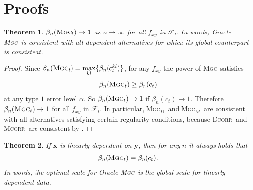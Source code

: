 \documentclass[11pt]{article}
\newcommand{\note}[2][]{\added[#1,remark={#2}]{}}
\providecommand{\sct}[1]{{\normalfont\textsc{#1}}}
\providecommand{\mb}[1]{\boldsymbol{#1}}
\providecommand{\mc}[1]{\mathcal{#1}}
\newcommand{\G}{c}
\newcommand{\Mgc}{\sct{Mgc}}
\newcommand{\Mgcd}{\sct{Mgc$_D$}}
\newcommand{\Mgcm}{\sct{Mgc$_M$}}
\newcommand{\Dcorr}{\sct{Dcorr}}
\newcommand{\Mcorr}{\sct{Mcorr}}
\newcommand{\mm}[1]{{\note{mm: #1}}}
\newtheorem{appThm}{Theorem}
\begin{document}
\section{Proofs}
\label{appen:proofs}
\begin{appThm}
$\beta_n(\Mgc_t) \rightarrow 1$ as $n \to \infty$ for all $f_{xy}$ in $\mc{F}_t$.
In words, Oracle \Mgc~is consistent with all dependent alternatives for which its global counterpart is consistent. 
\end{appThm}
\begin{proof}
Since $\beta_n(\Mgc_t)=\underset{kl}{\max}\{\beta_n(\G_t^{kl})\}$, for any $f_{xy}$ the power of \Mgc~satisfies
\begin{equation*}
\beta_n(\Mgc_t) \geq \beta_n(\G_t)
\end{equation*}
at any type $1$ error level $\alpha$. So $\beta_n(\Mgc_t) \rightarrow 1$ if $\beta_n(\G_t) \rightarrow 1$.
% 
Therefore $\beta_n(\Mgc_t) \rightarrow 1$ for all $f_{xy}$ in $\mc{F}_t$. In particular, \Mgcd~and \Mgcm~are consistent with all alternatives satisfying certain regularity conditions, because \Dcorr~and \Mcorr~are consistent by \cite{SzekelyRizzoBakirov2007, SzekelyRizzo2013a}. 
\end{proof}

\mm{what do we mean here by "linearly dependent"? $\mb{x}=\alpha\mb{y}$ for some scalar $\alpha$, or $\mb{x}=A\mb{y}$ for some matrix $A$? From the proof I'd say the former, while in the text I was thinking of the latter, and wonder if the conclusions ain't true for the general linear dependence (the latter case). And of course we are talking about $\mb{x}$ and $\mb{y}$ in Euclidean (or some vector) space at this point, maybe worth saying it.}
\begin{appThm}
If $\mb{x}$ is linearly dependent on $\mb{y}$, then for any $n$ it always holds that
\begin{equation}
\beta_n(\Mgc_t) = \beta_n(\G_t).
\end{equation}
In words, the optimal scale for Oracle \Mgc~is the global scale for linearly dependent data.
\end{appThm}
\end{document}
